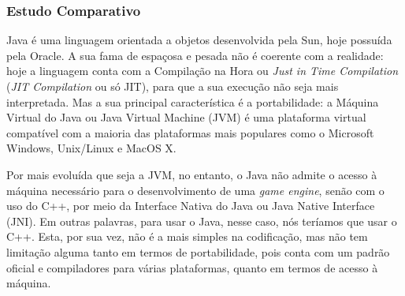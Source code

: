 \subsubsection{Estudo Comparativo}
%
\par
\par
Java é uma linguagem orientada a objetos desenvolvida pela Sun, hoje possuída pela Oracle. A sua fama de espaçosa e pesada não é coerente com a realidade: hoje a linguagem conta com a Compilação na Hora ou \textit{Just in Time Compilation} (\textit{JIT Compilation} ou só JIT), para que a sua execução não seja mais interpretada. Mas a sua principal característica é a portabilidade: a Máquina Virtual do Java ou Java Virtual Machine (JVM) é uma plataforma virtual compatível com a maioria das plataformas mais populares como o Microsoft Windows, Unix/Linux e MacOS X.
\par
Por mais evoluída que seja a JVM, no entanto, o Java não admite o acesso à máquina necessário para o desenvolvimento de uma \textit{game engine}, senão com o uso do C++, por meio da Interface Nativa do Java ou Java Native Interface (JNI). Em outras palavras, para usar o Java, nesse caso, nós teríamos que usar o C++. Esta, por sua vez, não é a mais simples na codificação, mas não tem limitação alguma tanto em termos de portabilidade, pois conta com um padrão oficial e compiladores para várias plataformas, quanto em termos de acesso à máquina.
%

